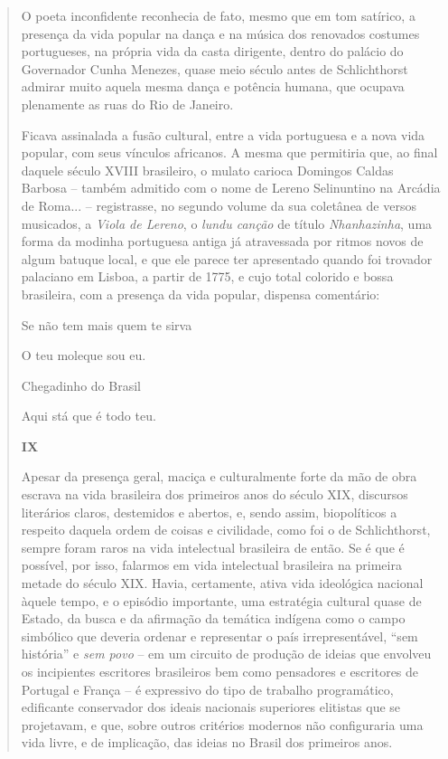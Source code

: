 \begin{quote}
O poeta inconfidente reconhecia de fato, mesmo que em tom satírico, a
presença da vida popular na dança e na música dos renovados costumes
portugueses, na própria vida da casta dirigente, dentro do palácio do
Governador Cunha Menezes, quase meio século antes de Schlichthorst
admirar muito aquela mesma dança e potência humana, que ocupava
plenamente as ruas do Rio de Janeiro.

Ficava assinalada a fusão cultural, entre a vida portuguesa e a nova
vida popular, com seus vínculos africanos. A mesma que permitiria que,
ao final daquele século XVIII brasileiro, o mulato carioca Domingos
Caldas Barbosa -- também admitido com o nome de Lereno Selinuntino na
Arcádia de Roma... -- registrasse, no segundo volume da sua coletânea de
versos musicados, a \emph{Viola de Lereno}, o \emph{lundu canção} de
título \emph{Nhanhazinha}, uma forma da modinha portuguesa antiga já
atravessada por ritmos novos de algum batuque local, e que ele parece
ter apresentado quando foi trovador palaciano em Lisboa, a partir de
1775, e cujo total colorido e bossa brasileira, com a presença da vida
popular, dispensa comentário:

Se não tem mais quem te sirva

O teu moleque sou eu.

Chegadinho do Brasil

Aqui stá que é todo teu.

\textbf{IX}

Apesar da presença geral, maciça e culturalmente forte da mão de obra
escrava na vida brasileira dos primeiros anos do século XIX, discursos
literários claros, destemidos e abertos, e, sendo assim, biopolíticos a
respeito daquela ordem de coisas e civilidade, como foi o de
Schlichthorst, sempre foram raros na vida intelectual brasileira de
então. Se é que é possível, por isso, falarmos em vida intelectual
brasileira na primeira metade do século XIX. Havia, certamente, ativa
vida ideológica nacional àquele tempo, e o episódio importante, uma
estratégia cultural quase de Estado, da busca e da afirmação da temática
indígena como o campo simbólico que deveria ordenar e representar o país
irrepresentável, ``sem história'' e \emph{sem povo} -- em um circuito de
produção de ideias que envolveu os incipientes escritores brasileiros
bem como pensadores e escritores de Portugal e França -- é expressivo do
tipo de trabalho programático, edificante conservador dos ideais
nacionais superiores elitistas que se projetavam, e que, sobre outros
critérios modernos não configuraria uma vida livre, e de implicação, das
ideias no Brasil dos primeiros anos.


\end{quote}
